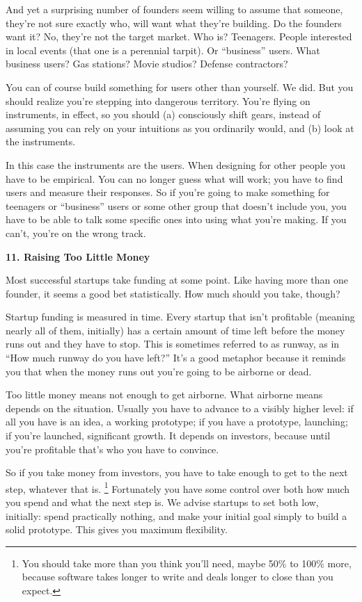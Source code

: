 \documentclass[12pt]{book}
\begin{document}
And yet a surprising number of founders seem willing to assume that
someone, they're not sure exactly who, will want what they're building.
Do the founders want it? No, they're not the target market. Who is?
Teenagers. People interested in local events (that one is a perennial
tarpit). Or ``business'' users. What business users? Gas stations? Movie
studios? Defense contractors?

You can of course build something for users other than yourself. We did.
But you should realize you're stepping into dangerous territory. You're
flying on instruments, in effect, so you should (a) consciously shift
gears, instead of assuming you can rely on your intuitions as you
ordinarily would, and (b) look at the instruments.

In this case the instruments are the users. When designing for other
people you have to be empirical. You can no longer guess what will work;
you have to find users and measure their responses. So if you're going
to make something for teenagers or ``business'' users or some other
group that doesn't include you, you have to be able to talk some
specific ones into using what you're making. If you can't, you're on the
wrong track.

\textbf{11. Raising Too Little Money}

Most successful startups take funding at some point. Like having more
than one founder, it seems a good bet statistically. How much should you
take, though?

Startup funding is measured in time. Every startup that isn't profitable
(meaning nearly all of them, initially) has a certain amount of time
left before the money runs out and they have to stop. This is sometimes
referred to as runway, as in ``How much runway do you have left?'' It's
a good metaphor because it reminds you that when the money runs out
you're going to be airborne or dead.

Too little money means not enough to get airborne. What airborne means
depends on the situation. Usually you have to advance to a visibly
higher level: if all you have is an idea, a working prototype; if you
have a prototype, launching; if you're launched, significant growth. It
depends on investors, because until you're profitable that's who you
have to convince.

So if you take money from investors, you have to take enough to get to
the next step, whatever that is. \footnote{You should take more than you think you'll need, maybe 50\% to
100\% more, because software takes longer to write and deals longer to
close than you expect.} Fortunately you
have some control over both how much you spend and what the next step
is. We advise startups to set both low, initially: spend practically
nothing, and make your initial goal simply to build a solid prototype.
This gives you maximum flexibility.
\end{document}
